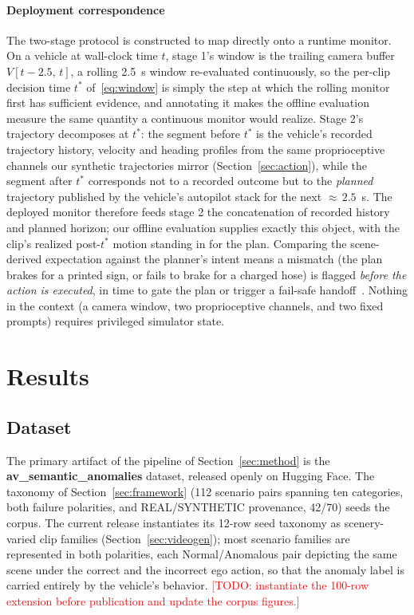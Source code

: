 \documentclass[conference]{IEEEtran}
\newcommand{\todo}[1]{\textcolor{red}{[TODO: #1]}}
\begin{document}
\paragraph{Deployment correspondence} The two-stage protocol is constructed to map directly onto a runtime monitor. On a vehicle at wall-clock time $t$, stage 1's window is the trailing camera buffer $V[t - 2.5,\, t]$, a rolling 2.5~s window re-evaluated continuously, so the per-clip decision time $t^*$ of~\eqref{eq:window} is simply the step at which the rolling monitor first has sufficient evidence, and annotating it makes the offline evaluation measure the same quantity a continuous monitor would realize. Stage 2's trajectory decomposes at $t^*$: the segment before $t^*$ is the vehicle's recorded trajectory history, velocity and heading profiles from the same proprioceptive channels our synthetic trajectories mirror (Section~\ref{sec:action}), while the segment after $t^*$ corresponds not to a recorded outcome but to the \emph{planned} trajectory published by the vehicle's autopilot stack for the next ${\approx}\,2.5$~s. The deployed monitor therefore feeds stage 2 the concatenation of recorded history and planned horizon; our offline evaluation supplies exactly this object, with the clip's realized post-$t^*$ motion standing in for the plan. Comparing the scene-derived expectation against the planner's intent means a mismatch (the plan brakes for a printed sign, or fails to brake for a charged hose) is flagged \emph{before the action is executed}, in time to gate the plan or trigger a fail-safe handoff~\cite{b13,b31}. Nothing in the context (a camera window, two proprioceptive channels, and two fixed prompts) requires privileged simulator state.

\section{Results}\label{sec:results}

\subsection{Dataset}\label{sec:dataset}

The primary artifact of the pipeline of Section~\ref{sec:method} is the \textbf{av\_semantic\_anomalies} dataset, released openly on Hugging Face. The taxonomy of Section~\ref{sec:framework} (112 scenario pairs spanning ten categories, both failure polarities, and REAL/SYNTHETIC provenance, 42/70) seeds the corpus. The current release instantiates its 12-row seed taxonomy as scenery-varied clip families (Section~\ref{sec:videogen}); most scenario families are represented in both polarities, each Normal/Anomalous pair depicting the same scene under the correct and the incorrect ego action, so that the anomaly label is carried entirely by the vehicle's behavior. \todo{instantiate the 100-row extension before publication and update the corpus figures.}
\end{document}
